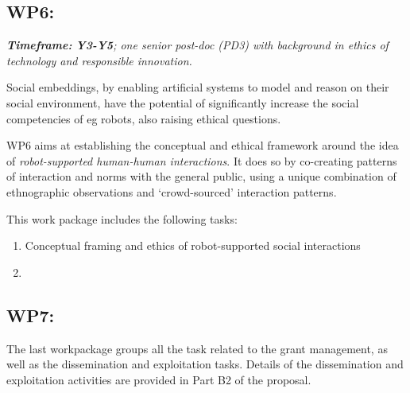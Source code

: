 \subsection{WP6: \textbf{\wpSix}}
\emph{    \textbf{Timeframe:} \textbf{Y3-Y5}; one senior post-doc (PD3)
with background in ethics of technology and responsible innovation.}

Social embeddings, by enabling artificial systems
to model and reason on their social environment, have the potential of
significantly increase the social competencies of eg robots, also raising
ethical questions.

WP6 aims at establishing the conceptual and ethical framework around the idea of
\emph{robot-supported human-human interactions}. It does so by co-creating
patterns of interaction and norms with the general public, using a unique
combination of ethnographic observations and `crowd-sourced' interaction
patterns.
%
%

This work package includes the following tasks:

\begin{enumerate}[label=\textbf{T6.\arabic*}]
    \item Conceptual framing and ethics of robot-supported social
interactions
    \item {}
\end{enumerate}

\subsection{WP7: \textbf{\wpSeven}}

The last workpackage groups all the task related to the grant management, as
well as the dissemination and exploitation tasks. Details of the dissemination
and exploitation activities are provided in Part B2 of the proposal.

\newpage

\printbibliography



